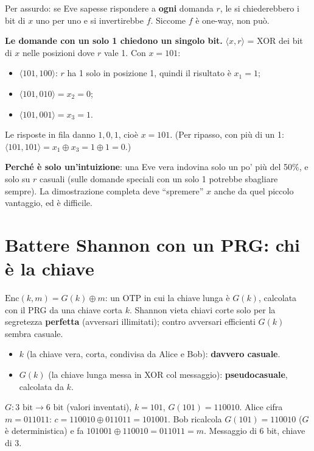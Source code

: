 \begin{inbreve}
Per assurdo: se Eve sapesse rispondere a \textbf{ogni} domanda \(r\), le si chiederebbero i bit di \(x\) uno per uno e si invertirebbe \(f\). Siccome \(f\) è one-way, non può.
\end{inbreve}

\textbf{Le domande con un solo 1 chiedono un singolo bit.} \(\langle x, r \rangle\) = XOR dei bit di \(x\) nelle posizioni dove \(r\) vale 1. Con \(x = 101\):
\begin{itemize}
  \item \(\langle 101, 100 \rangle\): \(r\) ha 1 solo in posizione 1, quindi il risultato è \(x_1 = 1\);
  \item \(\langle 101, 010 \rangle = x_2 = 0\);
  \item \(\langle 101, 001 \rangle = x_3 = 1\).
\end{itemize}
Le risposte in fila danno \(1, 0, 1\), cioè \(x = 101\). (Per ripasso, con più di un 1: \(\langle 101, 101 \rangle = x_1 \oplus x_3 = 1 \oplus 1 = 0\).)

\textbf{Perché è solo un'intuizione}: una Eve vera indovina solo un po' più del 50\%, e solo su \(r\) casuali (sulle domande speciali con un solo 1 potrebbe sbagliare sempre). La dimostrazione completa deve ``spremere'' \(x\) anche da quel piccolo vantaggio, ed è difficile.

\section{Battere Shannon con un PRG: chi è la chiave}

\begin{inbreve}
\(\text{Enc}(k, m) = G(k) \oplus m\): un OTP in cui la chiave lunga è \(G(k)\), calcolata con il PRG da una chiave corta \(k\). Shannon vieta chiavi corte solo per la segretezza \textbf{perfetta} (avversari illimitati); contro avversari efficienti \(G(k)\) sembra casuale.
\end{inbreve}

\begin{itemize}
  \item \(k\) (la chiave vera, corta, condivisa da Alice e Bob): \textbf{davvero casuale}.
  \item \(G(k)\) (la chiave lunga messa in XOR col messaggio): \textbf{pseudocasuale}, calcolata da \(k\).
\end{itemize}

\begin{esempio}
\(G : 3 \text{ bit} \to 6 \text{ bit}\) (valori inventati), \(k = 101\), \(G(101) = 110010\). Alice cifra \(m = 011011\): \(c = 110010 \oplus 011011 = 101001\). Bob ricalcola \(G(101) = 110010\) (\(G\) è deterministica) e fa \(101001 \oplus 110010 = 011011 = m\). Messaggio di 6 bit, chiave di 3.
\end{esempio}

